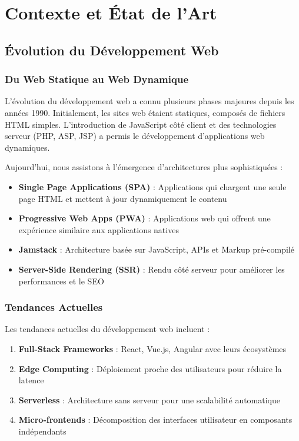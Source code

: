 \chapter{Contexte et État de l'Art}

\section{Évolution du Développement Web}

\subsection{Du Web Statique au Web Dynamique}

L'évolution du développement web a connu plusieurs phases majeures depuis les années 1990. Initialement, les sites web étaient statiques, composés de fichiers HTML simples. L'introduction de JavaScript côté client et des technologies serveur (PHP, ASP, JSP) a permis le développement d'applications web dynamiques.

Aujourd'hui, nous assistons à l'émergence d'architectures plus sophistiquées :
\begin{itemize}
    \item \textbf{Single Page Applications (SPA)} : Applications qui chargent une seule page HTML et mettent à jour dynamiquement le contenu
    \item \textbf{Progressive Web Apps (PWA)} : Applications web qui offrent une expérience similaire aux applications natives
    \item \textbf{Jamstack} : Architecture basée sur JavaScript, APIs et Markup pré-compilé
    \item \textbf{Server-Side Rendering (SSR)} : Rendu côté serveur pour améliorer les performances et le SEO
\end{itemize}

\subsection{Tendances Actuelles}

Les tendances actuelles du développement web incluent :
\begin{enumerate}
    \item \textbf{Full-Stack Frameworks} : React, Vue.js, Angular avec leurs écosystèmes
    \item \textbf{Edge Computing} : Déploiement proche des utilisateurs pour réduire la latence
    \item \textbf{Serverless} : Architecture sans serveur pour une scalabilité automatique
    \item \textbf{Micro-frontends} : Décomposition des interfaces utilisateur en composants indépendants
\end{enumerate}


